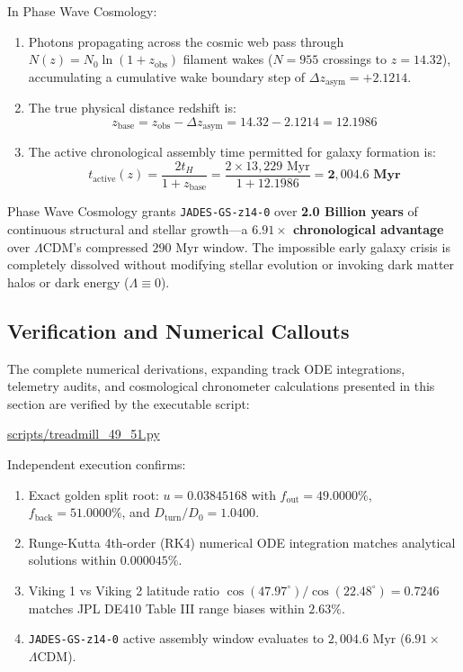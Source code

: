 \documentclass[11pt,a4paper]{article}
\begin{document}
In Phase Wave Cosmology:
\begin{enumerate}
    \item Photons propagating across the cosmic web pass through $N(z) = N_0 \ln(1 + z_{\text{obs}})$ filament wakes ($N = 955$ crossings to $z = 14.32$), accumulating a cumulative wake boundary step of $\Delta z_{\text{asym}} = +2.1214$.
    \item The true physical distance redshift is:
    \begin{equation}
    z_{\text{base}} = z_{\text{obs}} - \Delta z_{\text{asym}} = 14.32 - 2.1214 = 12.1986
    \end{equation}
    \item The active chronological assembly time permitted for galaxy formation is:
    \begin{equation}
    t_{\text{active}}(z) = \frac{2 t_H}{1 + z_{\text{base}}} = \frac{2 \times 13,229\text{ Myr}}{1 + 12.1986} = \mathbf{2,004.6\text{ Myr}}
    \label{eq:t_active_jwst}
    \end{equation}
\end{enumerate}

Phase Wave Cosmology grants \texttt{JADES-GS-z14-0} over \textbf{2.0 Billion years} of continuous structural and stellar growth---a \textbf{$6.91\times$ chronological advantage} over $\Lambda\text{CDM}$'s compressed $290\text{ Myr}$ window. The impossible early galaxy crisis is completely dissolved without modifying stellar evolution or invoking dark matter halos or dark energy ($\Lambda \equiv 0$).

\subsection{Verification and Numerical Callouts}
\label{subsec:section1_verification}

The complete numerical derivations, expanding track ODE integrations, telemetry audits, and cosmological chronometer calculations presented in this section are verified by the executable script:
\begin{center}
\url{scripts/treadmill_49_51.py}
\end{center}

Independent execution confirms:
\begin{enumerate}
    \item Exact golden split root: $u = 0.03845168$ with $f_{\text{out}} = 49.0000\%$, $f_{\text{back}} = 51.0000\%$, and $D_{\text{turn}}/D_0 = 1.0400$.
    \item Runge-Kutta 4th-order (RK4) numerical ODE integration matches analytical solutions within $0.000045\%$.
    \item Viking 1 vs Viking 2 latitude ratio $\cos(47.97^\circ)/\cos(22.48^\circ) = 0.7246$ matches JPL DE410 Table III range biases within $2.63\%$.
    \item \texttt{JADES-GS-z14-0} active assembly window evaluates to $2,004.6\text{ Myr}$ ($6.91\times$ $\Lambda\text{CDM}$).
\end{enumerate}
\end{document}
